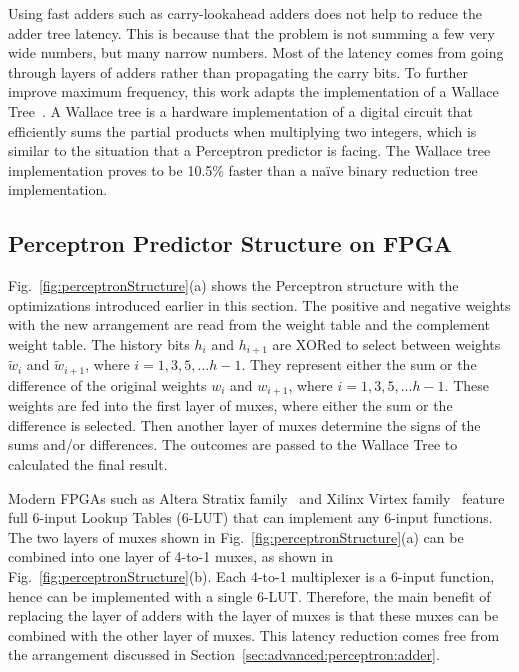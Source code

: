 Using fast adders such as carry-lookahead adders does not help to reduce the adder tree latency. This is because that the problem is not summing a few very wide numbers, but many narrow numbers. Most of the latency comes from going through layers of adders rather than propagating the carry bits. To further improve maximum frequency, this work adapts the implementation of a Wallace Tree~\cite{wallacetree}. A Wallace tree is a hardware implementation of a digital circuit that efficiently sums the partial products when multiplying two integers, which is similar to the situation that a Perceptron predictor is facing. The Wallace tree implementation proves to be 10.5\% faster than a na\"ive binary reduction tree implementation. 

\subsection{Perceptron Predictor Structure on FPGA}
\label{sec:advanced:perceptron:structure}
Fig.~\ref{fig:perceptronStructure}(a) shows the Perceptron structure with the optimizations introduced earlier in this section. The positive and negative weights with the new arrangement are read from the weight table and the complement weight table. The history bits $h_i$ and $h_{i+1}$ are XORed to select between weights $\widetilde{w}_i$ and $\widetilde{w}_{i+1}$, where $i = 1,3,5,...h-1$. They represent either the sum or the difference of the original weights $w_i$ and $w_{i+1}$, where $i = 1,3,5,...h-1$. These weights are fed into the first layer of muxes, where either the sum or the difference is selected. Then another layer of muxes determine the signs of the sums and/or differences. The outcomes are passed to the Wallace Tree to calculated the final result.

Modern FPGAs such as Altera Stratix family~\cite{StratixIV} and Xilinx Virtex family~\cite{virtex} feature full 6-input Lookup Tables (6-LUT) that can implement any 6-input functions. The two layers of muxes shown in Fig.~\ref{fig:perceptronStructure}(a) can be combined into one layer of 4-to-1 muxes, as shown in Fig.~\ref{fig:perceptronStructure}(b). Each 4-to-1 multiplexer is a 6-input function, hence can be implemented with a single 6-LUT. Therefore, the main benefit of replacing the layer of adders with the layer of muxes is that these muxes can be combined with the other layer of muxes. This latency reduction comes free from the arrangement discussed in Section~\ref{sec:advanced:perceptron:adder}.


